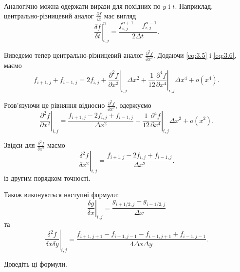 \begin{remark}
    Аналогічно можна одержати вирази для похідних по $y$ і $t$. Наприклад, центрально-різницевий аналог $\frac{\partial f}{\partial t}$ має вигляд
    \begin{equation}
        \label{eq:3.9}
        \left. \frac{\delta f}{\delta t} \right|_{i, j}^n = \frac{f_{i, j}^{n + 1} - f_{i, j}^{n - 1}}{2 \Delta t}.
    \end{equation}
\end{remark}

Виведемо тепер центрально-різницевий аналог $\frac{\partial^2 f}{\partial x^2}$. Додаючи \eqref{eq:3.5} і \eqref{eq:3.6}, маємо
\begin{equation}
    \label{eq:3.10}
    f_{i + 1, j} + f_{i - 1, j} = 2 f_{i, j} + \left. \frac{\partial^2 f}{\partial x^2} \right|_{i, j} \Delta x^2 + \frac{1}{12} \left. \frac{\partial^4 f}{\partial x^4} \right|_{i, j} \Delta x^4 + o(x^4).
\end{equation}

Розв'язуючи це рівняння відносно $\frac{\partial^2 f}{\partial x^2}$, одержуємо
\begin{equation}
    \label{eq:3.11}
    \left. \frac{\partial^2 f}{\partial x^2} \right|_{i, j} = \frac{f_{i + 1, j} - 2 f_{i, j} + f_{i - 1, j}}{\Delta x^2} + \frac{1}{12} \left. \frac{\partial^4 f}{\partial x^4} \right|_{i, j} \Delta x^2 + o(x^2).
\end{equation}

\begin{th_formula}
    Звідси для $\frac{\delta^2 f}{\delta x^2}$ маємо
    \begin{equation}
        \label{eq:3.12}
        \left. \frac{\delta^2 f}{\delta x^2} \right|_{i, j} = \frac{f_{i + 1, j} - 2 f_{i, j} + f_{i - 1, j}}{\Delta x^2}.
    \end{equation}
    із другим порядком точності.
\end{th_formula}

Також виконуються наступні формули:
\begin{equation}
    \label{eq:3.13}
    \left. \frac{\delta g}{\delta x} \right|_{i, j} = \frac{g_{i + 1/2, j} - g_{i - 1/2, j}}{\Delta x}
\end{equation}
та
\begin{equation}
    \label{eq:3.14}
    \left. \frac{\delta^2 f}{\delta x \delta y} \right|_{i, j} = \frac{f_{i + 1, j + 1} - f_{i + 1, j - 1} - f_{i - 1, j + 1} + f_{i - 1, j - 1}}{4 \Delta x \Delta y}.
\end{equation}
\begin{exercise}
    Доведіть ці формули.
\end{exercise}

